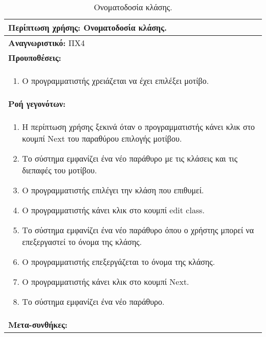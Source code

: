 \begin{table}[H]
	\hspace*{-0.2cm}
    \centering
    \scriptsize
	\begin{tabular}{|p{10cm}|}
	\hline
		\textbf{Περίπτωση χρήσης:} Ονοματοδοσία κλάσης. \\
	\hline
		\textbf{Αναγνωριστικό:} ΠΧ4 \\
	\hline	
		\textbf{Προυποθέσεις:} \\
		\begin{enumerate}
		 \item Ο προγραμματιστής χρειάζεται να έχει επιλέξει μοτίβο.
		\end{enumerate} \\
	\hline
		\textbf{Ροή γεγονότων:} \\
		\begin{enumerate}
		 \item Η περίπτωση χρήσης ξεκινά όταν ο προγραμματιστής κάνει κλικ στο κουμπί Next του παραθύρου επιλογής μοτίβου.
		 \item Το σύστημα εμφανίζει ένα νέο παράθυρο με τις κλάσεις και τις διεπαφές του μοτίβου.
		 \item Ο προγραμματιστής επιλέγει την κλάση που επιθυμεί.
		 \item Ο προγραμματιστής κάνει κλικ στο κουμπί edit class.
 		 \item Το σύστημα εμφανίζει ένα νέο παράθυρο όπου ο χρήστης μπορεί να επεξεργαστεί το όνομα της κλάσης.
 		 \item Ο προγραμματιστής επεξεργάζεται το όνομα της κλάσης.
 		 \item Ο προγραμματιστής κάνει κλικ στο κουμπί Next.
 		 \item Το σύστημα εμφανίζει ένα νέο παράθυρο.
		\end{enumerate} \\
	\hline
		\textbf{Μετα-συνθήκες:} \\
	\hline
    \end{tabular}
    \caption{Ονοματοδοσία κλάσης.}
    \label{tab:nameClassUC}
\end{table}
